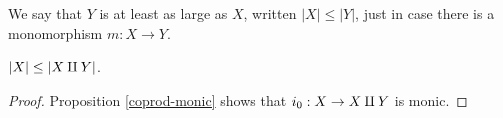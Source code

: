 






\begin{defn} We say that $Y$ is at least as large as $X$, written
  $|X|\leq |Y|$, just in case there is a monomorphism $m:X\to
  Y$.  \end{defn}

\begin{prop} $|X|\leq |X\amalg Y|$. \end{prop}

\begin{proof} Proposition \ref{coprod-monic} shows that $i_0:X\to
  X\amalg Y$ is monic.  \end{proof}


